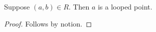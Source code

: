 

\begin{proposition}\label{reduced_missing_guard}
    Suppose $(a,b)\in R$.
    Then $a$ is a looped point.
\end{proposition}
\begin{proof}
    Follows by notion.
\end{proof}
